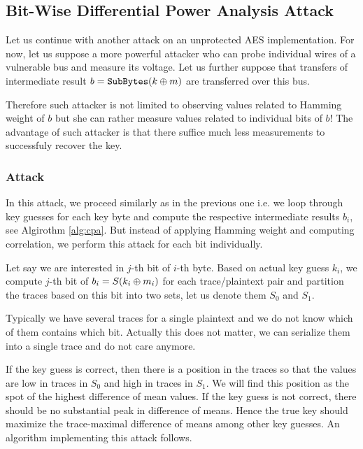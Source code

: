 
\subsection{Bit-Wise Differential Power Analysis Attack}

Let us continue with another attack on an unprotected AES implementation. For now, let us suppose a more powerful attacker who can probe individual wires of a vulnerable bus and measure its voltage. Let us further suppose that transfers of intermediate result $b = \texttt{SubBytes}(k\oplus m)$ are transferred over this bus.

Therefore such attacker is not limited to observing values related to Hamming weight of $b$ but she can rather measure values related to individual bits of $b$! The advantage of such attacker is that there suffice much less measurements to successfuly recover the key.

\subsubsection{Attack}
	
	In this attack, we proceed similarly as in the previous one i.e. we loop through key guesses for each key byte and compute the respective intermediate results $b_i$, see Algirothm \ref{alg:cpa}. But instead of applying Hamming weight and computing correlation, we perform this attack for each bit individually.
	
	Let say we are interested in $j$-th bit of $i$-th byte. Based on actual key guess $k_i$, we compute $j$-th bit of $b_i = S(k_i\oplus m_i)$ for each trace/plaintext pair and partition the traces based on this bit into two sets, let us denote them $S_0$ and $S_1$.
	
	\begin{note}
	\label{note:concattraces}
		Typically we have several traces for a single plaintext and we do not know which of them contains which bit. Actually this does not matter, we can serialize them into a single trace and do not care anymore.
	\end{note}
	
	If the key guess is correct, then there is a position in the traces so that the values are low in traces in $S_0$ and high in traces in $S_1$. We will find this position as the spot of the highest difference of mean values. If the key guess is not correct, there should be no substantial peak in difference of means. Hence the true key should maximize the trace-maximal difference of means among other key guesses. An algorithm implementing this attack follows.
	
